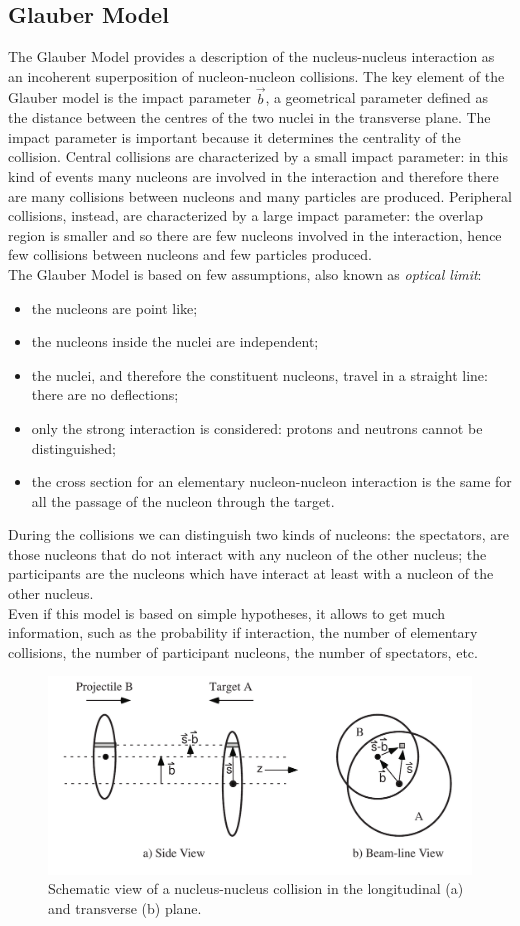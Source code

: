 \subsection{Glauber Model}
The Glauber Model provides a description of the nucleus-nucleus interaction as an incoherent superposition of nucleon-nucleon collisions.
The key element of the Glauber model is the impact parameter $\vec{b}$, a geometrical parameter defined as the distance between the centres of the two nuclei in the transverse plane. The impact parameter is important because it determines the centrality of the collision. Central collisions are characterized by a small impact parameter: in this kind of events many nucleons are involved in the interaction and therefore there are many collisions between nucleons and many particles are produced. Peripheral collisions, instead, are characterized by a large impact parameter: the overlap region is smaller and so there are few nucleons involved in the interaction, hence few collisions between nucleons and few particles produced.\\
The Glauber Model is based on few assumptions, also known as \textit{optical limit}:
\begin{itemize}
 \item the nucleons are point like;
 \item the nucleons inside the nuclei are independent;
 \item the nuclei, and therefore the constituent nucleons, travel in a straight line: there are no deflections;
 \item only the strong interaction is considered: protons and neutrons cannot be distinguished;
 \item the cross section for an elementary nucleon-nucleon interaction is the same for all the passage of the nucleon through the target.
\end{itemize}
During the collisions we can distinguish two kinds of nucleons: the spectators, are those nucleons that do not interact with any nucleon of the other nucleus; the participants are the nucleons which have interact at least with a nucleon of the other nucleus.\\
Even if this model is based on simple hypotheses, it allows to get much information, such as the probability if interaction, the number of elementary collisions, the number of participant nucleons, the number of spectators, etc.
%
\begin{figure}
  \centering
  \includegraphics[scale=0.30]{figures/Impact_parameter.png}
  \caption{Schematic view of a nucleus-nucleus collision in the longitudinal (a) and transverse (b) plane.}
  \label{fig:impact}
\end{figure}
%
